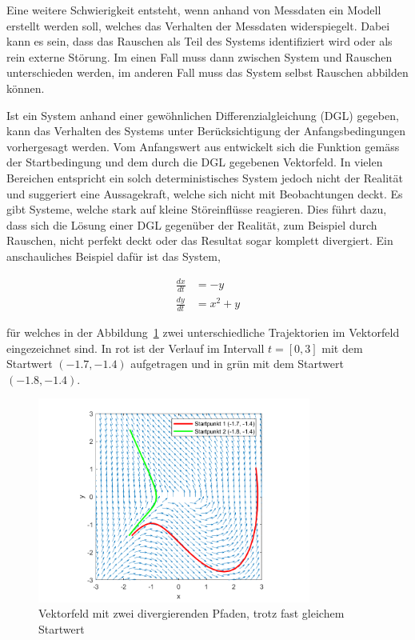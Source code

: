 Eine weitere Schwierigkeit entsteht, wenn anhand von Messdaten ein Modell erstellt werden soll, welches das Verhalten der Messdaten widerspiegelt. Dabei kann es sein, dass das Rauschen als Teil des Systems identifiziert wird oder als rein externe Störung. Im einen Fall muss dann zwischen System und Rauschen unterschieden werden, im anderen Fall muss das System selbst Rauschen abbilden können.

Ist ein System anhand einer gewöhnlichen Differenzialgleichung (DGL) gegeben, kann das Verhalten des Systems unter Berücksichtigung der Anfangsbedingungen vorhergesagt werden. Vom Anfangswert aus entwickelt sich die Funktion gemäss der Startbedingung und dem durch die DGL gegebenen Vektorfeld. In vielen Bereichen entspricht ein solch deterministisches System jedoch nicht der Realität und suggeriert eine Aussagekraft, welche sich nicht mit Beobachtungen deckt. Es gibt Systeme, welche stark auf kleine Störeinflüsse reagieren. Dies führt dazu, dass sich die Lösung einer DGL gegenüber der Realität, zum Beispiel durch Rauschen, nicht perfekt deckt oder das Resultat sogar komplett divergiert. Ein anschauliches Beispiel dafür ist das System,

\begin{align}
	\frac{dx}{dt} &= -y \\
	\frac{dy}{dt} &= x^2 + y
	\label{brown:divergentEquation}
\end{align}

für welches in der Abbildung~\ref{brown:divergentAndConvergentSystem} zwei unterschiedliche Trajektorien im Vektorfeld eingezeichnet sind. In rot ist der Verlauf im Intervall  $ t = [0, 3] $ mit dem Startwert $ (-1.7, -1.4) $ aufgetragen und in grün mit dem Startwert $ (-1.8, -1.4) $.

\begin{figure}
	\centering
	\includegraphics[width=0.8\textwidth]{papers/brown/images/divergentDGL.png}
	\caption{Vektorfeld mit zwei divergierenden Pfaden, trotz fast gleichem Startwert}
	\label{brown:divergentAndConvergentSystem}
\end{figure}

